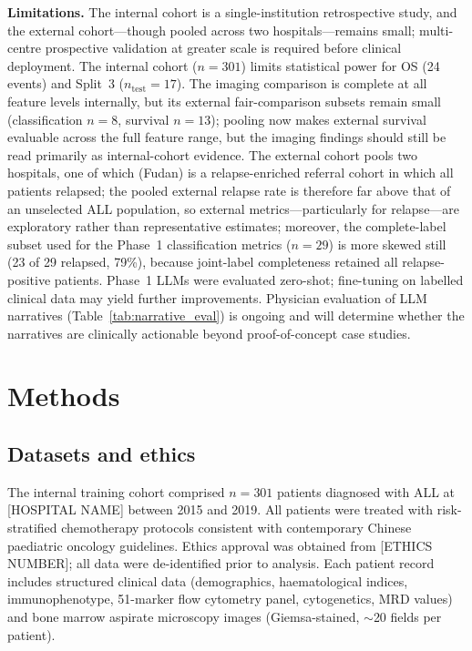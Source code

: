 \documentclass[pdflatex,sn-nature]{sn-jnl}
\begin{document}
\textbf{Limitations.}
The internal cohort is a single-institution retrospective study, and
the external cohort—though pooled across two hospitals—remains small;
multi-centre prospective validation at greater scale is required
before clinical deployment.
The internal cohort ($n=301$) limits statistical power for OS
(24 events) and Split~3 ($n_\text{test}=17$).
The imaging comparison is complete at all feature levels internally,
but its external fair-comparison subsets remain small (classification
$n=8$, survival $n=13$); pooling now makes external survival
evaluable across the full feature range, but the imaging findings
should still be read primarily as internal-cohort evidence.
The external cohort pools two hospitals, one of which (Fudan) is a
relapse-enriched referral cohort in which all patients relapsed;
the pooled external relapse rate is therefore far above that of an
unselected ALL population, so external metrics—particularly for
relapse—are exploratory rather than representative estimates;
moreover, the complete-label subset used for the Phase~1
classification metrics ($n{=}29$) is more skewed still (23 of 29
relapsed, 79\%), because joint-label completeness retained all
relapse-positive patients.
Phase~1 LLMs were evaluated zero-shot; fine-tuning on labelled clinical
data may yield further improvements.
Physician evaluation of LLM narratives (Table~\ref{tab:narrative_eval})
is ongoing and will determine whether the narratives are clinically
actionable beyond proof-of-concept case studies.

\section{Methods}\label{sec:methods}

\subsection{Datasets and ethics}\label{sec:dataset}

The internal training cohort comprised $n=301$ patients diagnosed with
ALL at [HOSPITAL NAME] between 2015 and 2019.
All patients were treated with risk-stratified chemotherapy protocols
consistent with contemporary Chinese paediatric oncology guidelines.
Ethics approval was obtained from [ETHICS NUMBER]; all data were
de-identified prior to analysis.
Each patient record includes structured clinical data (demographics,
haematological indices, immunophenotype, 51-marker flow cytometry panel,
cytogenetics, MRD values) and bone marrow aspirate microscopy images
(Giemsa-stained, $\sim$20 fields per patient).
\end{document}

